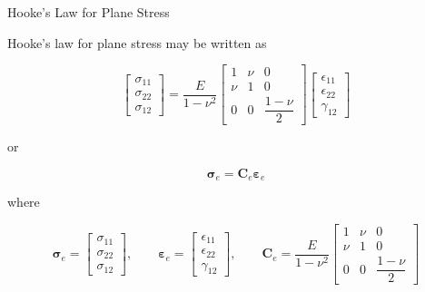 \documentclass[aspectratio=169]{beamer}
\begin{document}
\begin{frame}{Hooke's Law for Plane Stress}

Hooke's law for plane stress may be written as

\[
\begin{bmatrix}
\sigma_{11}\\
\sigma_{22}\\
\sigma_{12}
\end{bmatrix}
=
\frac{E}{1-\nu^2}
\begin{bmatrix}
1 & \nu & 0\\
\nu & 1 & 0\\
0 & 0 & \dfrac{1-\nu}{2}
\end{bmatrix}
\begin{bmatrix}
\epsilon_{11}\\
\epsilon_{22}\\
\gamma_{12}
\end{bmatrix}
\]

or


\[
\boldsymbol{\sigma}_e=\mathbf{C}_e\boldsymbol{\varepsilon}_e
\]

where

\[
\boldsymbol{\sigma}_e=
\begin{bmatrix}
\sigma_{11}\\
\sigma_{22}\\
\sigma_{12}
\end{bmatrix},
\qquad
\boldsymbol{\varepsilon}_e=
\begin{bmatrix}
\epsilon_{11}\\
\epsilon_{22}\\
\gamma_{12}
\end{bmatrix},
\qquad
\mathbf{C}_e=
\frac{E}{1-\nu^2}
\begin{bmatrix}
1 & \nu & 0\\
\nu & 1 & 0\\
0 & 0 & \dfrac{1-\nu}{2}
\end{bmatrix}
\]



\end{frame}
\end{document}
